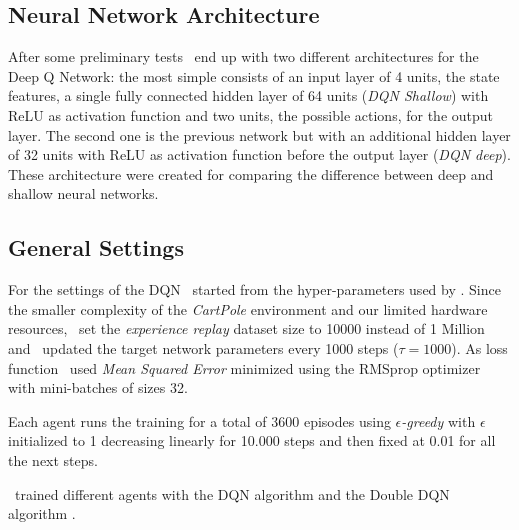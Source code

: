 \subsection{Neural Network Architecture}

After some preliminary tests \auth~end up with two different architectures for the Deep Q Network: the most simple consists of an input layer of 4 units, the state features, a single fully connected hidden layer of 64 units (\textit{DQN Shallow}) with ReLU as activation function and two units, the possible actions, for the output layer. The second one is the previous network but with an additional hidden layer of 32 units with ReLU as activation function before the output layer (\textit{DQN deep}). %
These architecture were created for comparing the difference between deep and shallow neural networks.

\subsection{General Settings}

For the settings of the DQN \auth~started from the hyper-parameters used by \citeauthor{Hasselt:2016:DRL:3016100.3016191} . Since the smaller complexity of the \textit{CartPole} environment and our limited hardware resources, \auth~set the \textit{experience replay} dataset size to 10000 instead of 1 Million and \auth~updated the target network parameters every 1000 steps ($\tau = 1000$). As loss function \auth~used \textit{Mean Squared Error} minimized using the RMSprop optimizer with mini-batches of sizes 32.

Each agent runs the training for a total of 3600 episodes using \textit{$\epsilon$-greedy} with $\epsilon$ initialized to 1 decreasing linearly for 10.000 steps and then fixed at 0.01 for all the next steps.

\Auth~trained different agents with the DQN algorithm \cite{Mnih2015} and the Double DQN algorithm \cite{Hasselt:2016:DRL:3016100.3016191}.

